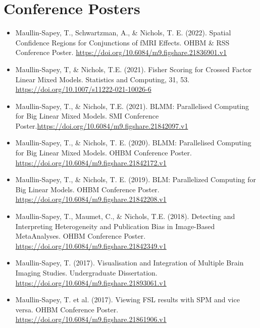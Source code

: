 \documentclass{friggeri-cv}
\begin{document}
\section{Conference Posters}
\footnotesize{
\begin{itemize}
    \item Maullin-Sapey, T., Schwartzman, A., \& Nichols, T. E. (2022). Spatial Confidence Regions for Conjunctions of fMRI Effects. OHBM \& RSS Conference Poster. \url{https://doi.org/10.6084/m9.figshare.21836901.v1}
    \item Maullin-Sapey, T, \& Nichols, T.E. (2021). Fisher Scoring for Crossed Factor Linear Mixed Models. Statistics and Computing, 31, 53. \url{https://doi.org/10.1007/s11222-021-10026-6}
    \item Maullin-Sapey, T., \& Nichols, T.E. (2021). BLMM: Parallelised Computing for Big Linear Mixed Models. SMI Conference Poster.\url{https://doi.org/10.6084/m9.figshare.21842097.v1}
    \item Maullin-Sapey, T., \& Nichols, T. E. (2020). BLMM: Parallelised Computing for Big Linear Mixed Models. OHBM Conference Poster. \url{https://doi.org/10.6084/m9.figshare.21842172.v1}
    \item Maullin-Sapey, T., \& Nichols, T. E. (2019). BLM: Parallelized Computing for Big Linear Models. OHBM Conference Poster. \url{https://doi.org/10.6084/m9.figshare.21842208.v1}
    \item Maullin-Sapey, T., Maumet, C., \& Nichols, T.E. (2018). Detecting and Interpreting Heterogeneity and Publication Bias in Image-Based MetaAnalyses. OHBM Conference Poster. \url{https://doi.org/10.6084/m9.figshare.21842349.v1}
    \item Maullin-Sapey, T. (2017). Visualisation and Integration of Multiple Brain Imaging Studies. Undergraduate Dissertation. \url{https://doi.org/10.6084/m9.figshare.21893061.v1}
    \item Maullin-Sapey, T. et al. (2017). Viewing FSL results with SPM and vice versa. OHBM Conference Poster. \url{https://doi.org/10.6084/m9.figshare.21861906.v1}
\end{itemize}
}
\normalsize
\end{document}
